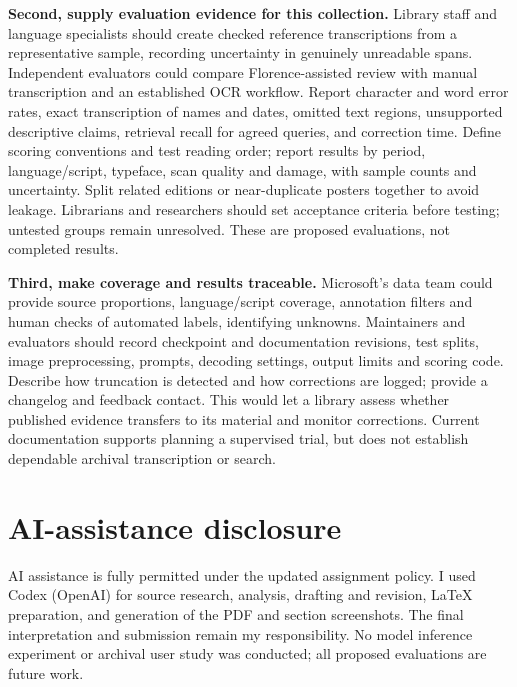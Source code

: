 \documentclass[11pt,letterpaper]{article}
\begin{document}
\textbf{Second, supply evaluation evidence for this collection.} Library staff and language specialists should create checked reference transcriptions from a representative sample, recording uncertainty in genuinely unreadable spans. Independent evaluators could compare Florence-assisted review with manual transcription and an established OCR workflow. Report character and word error rates, exact transcription of names and dates, omitted text regions, unsupported descriptive claims, retrieval recall for agreed queries, and correction time. Define scoring conventions and test reading order; report results by period, language/script, typeface, scan quality and damage, with sample counts and uncertainty. Split related editions or near-duplicate posters together to avoid leakage. Librarians and researchers should set acceptance criteria before testing; untested groups remain unresolved. These are proposed evaluations, not completed results.

\textbf{Third, make coverage and results traceable.} Microsoft's data team could provide source proportions, language/script coverage, annotation filters and human checks of automated labels, identifying unknowns. Maintainers and evaluators should record checkpoint and documentation revisions, test splits, image preprocessing, prompts, decoding settings, output limits and scoring code. Describe how truncation is detected and how corrections are logged; provide a changelog and feedback contact. This would let a library assess whether published evidence transfers to its material and monitor corrections. Current documentation supports planning a supervised trial, but does not establish dependable archival transcription or search.

\clearpage
\begingroup
\raggedright


\endgroup

\section*{AI-assistance disclosure}
AI assistance is fully permitted under the updated assignment policy. I used Codex (OpenAI) for source research, analysis, drafting and revision, LaTeX preparation, and generation of the PDF and section screenshots. The final interpretation and submission remain my responsibility. No model inference experiment or archival user study was conducted; all proposed evaluations are future work.
\end{document}
